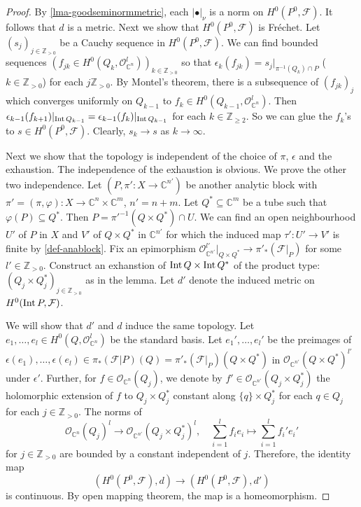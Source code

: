 \begin{proof}
By \cref{lma-goodseminormmetric}, each $|\bullet|_{\nu}$ is a norm on $H^0(P^0, \mathcal{F})$. It follows that $d$ is a metric. Next we show that $H^0(P^0, \mathcal{F})$ is Fréchet. 
Let $(s_j)_{j\in \mathbb{Z}_{>0}}$ be a Cauchy sequence in $H^0(P^0, \mathcal{F})$. We can find bounded sequences $(f_{jk}\in H^0(Q_k,\mathcal{O}^l_{\mathbb{C}^n}))_{k\in \mathbb{Z}_{>0}}$ so that $\epsilon_k(f_{jk})=s_j|_{\pi^{-1}(Q_k)\cap P}$ ($k\in \mathbb{Z}_{>0}$) for each $j\mathbb{Z}_{>0}$. By Montel's theorem, there is a subsequence of $(f_{jk})_j$ which converges uniformly on $Q_{k-1}$ to $f_k\in H^0(Q_{k-1},\mathcal{O}_{\mathbb{C}^n}^l)$. Then $\epsilon_{k-1}(f_{k+1})|_{\operatorname{Int} Q_{k-1}}=\epsilon_{k-1}(f_k)|_{\operatorname{Int} Q_{k-1}}$ for each $k\in \mathbb{Z}_{\geq 2}$. So we can glue the $f_k$'s to $s\in H^0(P^0,\mathcal{F})$. Clearly, $s_k\to s$ as $k\to\infty$.

Next we show that the topology is independent of the choice of $\pi$, $\epsilon$ and the exhaustion. 
The independence of the exhaustion is obvious. We prove the other two independence.
Let $(P,\pi':X\rightarrow \mathbb{C}^{n'})$ be another analytic block with $\pi'=(\pi,\varphi):X\rightarrow \mathbb{C}^n\times \mathbb{C}^m$, $n'=n+m$. Let $Q^*\subseteq \mathbb{C}^m$ be a tube such that $\varphi(P)\subseteq Q^*$. Then $P=\pi'^{-1}(Q\times Q^*)\cap U$. We can find an open neighbourhood $U'$ of $P$ in $X$ and $V'$ of $Q\times Q^*$ in $\mathbb{C}^{n'}$ for which the induced map $\tau':U'\rightarrow V'$ is finite by \cref{def-anablock}. Fix an epimorphism $\mathcal{O}_{\mathbb{C}^{n'}}^{l'}|_{Q\times Q^*}\rightarrow \pi'_*(\mathcal{F}|_P)$ for some $l'\in \mathbb{Z}_{>0}$. Construct an exhanstion of $\operatorname{Int} Q\times \operatorname{Int} Q^*$ of the product type: $(Q_j\times Q_j^*)_{j\in \mathbb{Z}_{>0}}$ as in the lemma. Let $d'$ denote the induced metric on $H^0(\operatorname{Int} P,\mathcal{F})$.


We will show that $d'$ and $d$ induce the same topology. Let $e_1,\ldots,e_l\in H^0(Q,\mathcal{O}_{\mathbb{C}^n}^l)$ be the standard basis.  Let $e_1',\ldots,e_l'$ be the preimages of $\epsilon(e_1),\ldots,\epsilon(e_l)\in \pi_* (\mathcal{F}|P)(Q)=\pi'_*(\mathcal{F}|_P)(Q\times Q^*)$ in $\mathcal{O}_{\mathbb{C}^{n'}}(Q\times Q^*)^{l'}$ under $\epsilon'$. Further, for $f\in \mathcal{O}_{\mathbb{C}^n}(Q_j)$, we denote by $f'\in\mathcal{O}_{\mathbb{C}^{n'}}(Q_j\times Q_j^*)$ the holomorphic extension of $f$ to $Q_j\times Q_j^*$ constant along $\{q\}\times Q_j^*$ for each $q\in Q_j$  for each $j\in \mathbb{Z}_{>0}$. The norms of 
\[
\mathcal{O}_{\mathbb{C}^n}(Q_j)^l\rightarrow \mathcal{O}_{\mathbb{C}^{n'}}(Q_j\times Q_j^*)^l,\quad \sum_{i=1}^l f_i e_i\mapsto \sum_{i=1}^l f_i' e_i'    
\]
for $j\in \mathbb{Z}_{>0}$ are bounded by a constant independent of $j$. Therefore, the identity map 
\[
  (H^0(P^0,\mathcal{F}),d)  \rightarrow (H^0(P^0,\mathcal{F}),d')
\] 
is continuous. By open mapping theorem, the map is a homeomorphism.
\end{proof}




